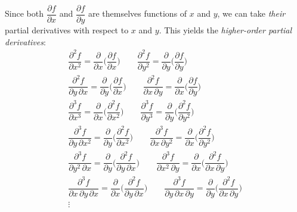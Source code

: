 Since both $\dfrac{\partial f}{\partial x}$ and $\dfrac{\partial f}{\partial y}$ are themselves functions of $x$ and
$y$, we can take \emph{their} partial derivatives with respect to $x$ and $y$. This yields the \emph{higher-order
partial derivatives}:
\begin{gather*}
 \dfrac{\partial^2 f}{\partial x^2} = \dfrac{\partial}{\partial x} \biggl( \dfrac{\partial f}{\partial x} \biggr)
 \qquad\dfrac{\partial^2 f}{\partial y^2} =\dfrac{\partial}{\partial y} \biggl( \dfrac{\partial f}{\partial y} \biggr)\\
 \dfrac{\partial^2 f}{\partial y \, \partial x} = \dfrac{\partial}{\partial y} \biggl( \dfrac{\partial f}{\partial x}
  \biggr)\qquad
 \dfrac{\partial^2 f}{\partial x \, \partial y} = \dfrac{\partial}{\partial x} \biggl( \dfrac{\partial f}{\partial y}
  \biggr)\\
 \dfrac{\partial^3 f}{\partial x^3} = \dfrac{\partial}{\partial x} \biggl( \dfrac{\partial^2 f}{\partial x^2} \biggr)
 \qquad\dfrac{\partial^3 f}{\partial y^3} =\dfrac{\partial}{\partial y} \biggl( \dfrac{\partial^2 f}{\partial y^2}
 \biggr)\\
 \dfrac{\partial^3 f}{\partial y \, \partial x^2} =
  \dfrac{\partial}{\partial y} \biggl( \dfrac{\partial^2 f}{\partial x^2} \biggr)\qquad
 \dfrac{\partial^3 f}{\partial x \, \partial y^2} =
  \dfrac{\partial}{\partial x} \biggl( \dfrac{\partial^2 f}{\partial y^2} \biggr)\\
 \dfrac{\partial^3 f}{\partial y^2 \, \partial x} =
  \dfrac{\partial}{\partial y} \biggl( \dfrac{\partial^2 f}{\partial y \, \partial x} \biggr)\qquad
 \dfrac{\partial^3 f}{\partial x^2 \, \partial y} =
  \dfrac{\partial}{\partial x} \biggl( \dfrac{\partial^2 f}{\partial x \, \partial y} \biggr)\\
 \dfrac{\partial^3 f}{\partial x \, \partial y \, \partial x} =
  \dfrac{\partial}{\partial x} \biggl( \dfrac{\partial^2 f}{\partial y \, \partial x} \biggr)\qquad
 \dfrac{\partial^3 f}{\partial y \, \partial x \, \partial y} =
  \dfrac{\partial}{\partial y} \biggl( \dfrac{\partial^2 f}{\partial x \, \partial y} \biggr)\\
 \vdots
\end{gather*}

